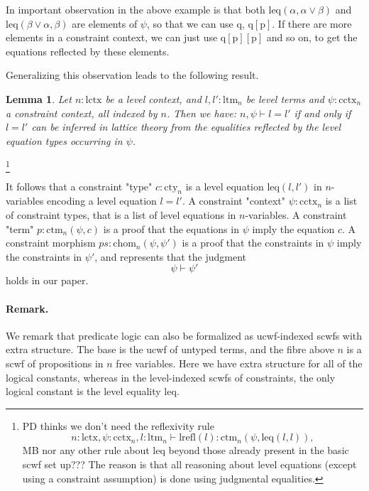 \documentclass[11pt,a4paper]{article}
\newtheorem{lemma}{Lemma}[theorem]
\theoremstyle{definition}
\def\lctx{\mathrm{lctx}}
\def\ltm{\mathrm{ltm}}
\def\leq{\mathrm{leq}}
\def\lrefl{\mathrm{lrefl}}
\def\cctx{\mathrm{cctx}}
\def\cty{\mathrm{cty}}
\def\ctm{\mathrm{ctm}}
\def\chom{\mathrm{chom}}
\def\p{\mathrm{p}}
\def\q{\mathrm{q}}
\begin{document}
In important observation in the above example is that
both $\leq(\alpha,\alpha\vee\beta)$ and $\leq(\beta\vee\alpha,\beta)$
are elements of $\psi$, so that we can use $\q$, $\q[\p]$. If there
are more elements in a constraint context, we can just use $\q[\p][\p]$
and so on, to get the equations reflected by these elements.

Generalizing this observation leads to the following result.

\begin{lemma}
Let $n:\lctx$ be a level context, and $l,l':\ltm_n$ be level terms and 
$\psi:\cctx_n$ a constraint context, all indexed by $n$. Then we have:
$n,\psi\vdash l=l'$ if and only if $l=l'$ can be inferred in 
lattice theory from the equalities reflected by the level
equation types occurring in $\psi$. 
\end{lemma}

\footnote{PD thinks we don't need the reflexivity rule 
\[
n : \lctx, \psi : \cctx_n, l : \ltm_n \vdash \lrefl(l) : \ctm_n(\psi,\leq(l,l)),
\]
MB nor any other rule about $\leq$ beyond those already present in the basic
scwf set up??? The reason is that all reasoning about level equations 
(except using a constraint assumption) is done using judgmental equalities.}



It follows that a constraint "type" $c : \cty_n$ is a level equation $\leq(l,l')$ in $n$-variables encoding a level equation $l = l'$. A constraint "context" $\psi : \cctx_n$ is a list of constraint types, that is a list of level equations in $n$-variables. A constraint "term" $p : \ctm_n(\psi,c)$ is a proof that the equations in $\psi$ imply the equation $c$. A constraint morphism $ps : \chom_n(\psi,\psi')$ is a proof that the constraints in $\psi$ imply the constraints in $\psi'$, and represents that the judgment $$\psi \vdash \psi'$$ holds in our paper. 

\paragraph{Remark.} We remark that predicate logic can also be formalized as ucwf-indexed scwfs with extra structure. The base is the ucwf of untyped terms, and the fibre above $n$ is a scwf of propositions in $n$ free variables. Here we have extra structure for all of the logical constants, whereas in the level-indexed scwfs of constraints, the only logical constant is the level equality $\leq$.
\end{document}
